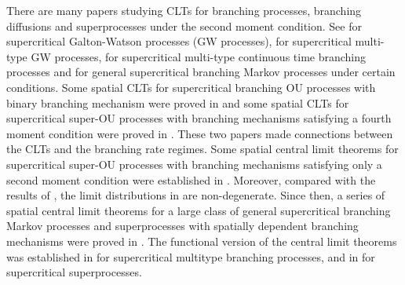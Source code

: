 \documentclass[12pt,a4paper]{amsart}
\theoremstyle{plain}
\theoremstyle{definition}
\numberwithin{equation}{section}
\begin{document}
There are many papers studying CLTs for branching processes, branching diffusions and superprocesses under the second moment condition.
See \cite{Heyde1970A-rate, HeydeBrown1871An-invariance, HeydeLeslie1971Improved} for supercritical Galton-Watson processes (GW processes), \cite{KestenStigum1966Additional,KestenStigum1966A-limit} for supercritical multi-type GW processes, \cite{Athreya1969Limit,Athreya1969LimitB,Athreya1971Some} for supercritical multi-type continuous time branching processes and \cite{AsmussenHering1983Branching} for general supercritical branching Markov processes under certain conditions.
Some spatial CLTs for   supercritical branching OU processes with binary branching mechanism were proved in \cite{AdamczakMilos2015CLT} and some spatial CLTs for supercritical super-OU processes with branching mechanisms satisfying a fourth moment condition were proved in \cite{Milos2012Spatial}.
These two papers made connections between the CLTs and  the branching rate regimes.
Some spatial central limit theorems for supercritical super-OU  processes with branching mechanisms satisfying only a second moment condition were established in \cite{RenSongZhang2014Central}.
Moreover, compared with the results of \cite{AdamczakMilos2015CLT,Milos2012Spatial}, the limit distributions in \cite{RenSongZhang2014Central} are non-degenerate.
Since then, a series of spatial central limit theorems for a large class of general supercritical branching Markov processes and superprocesses with spatially dependent branching mechanisms were proved in \cite{RenSongZhang2014CentralB,RenSongZhang2015Central,RenSongZhang2017Central}.
The functional version of the central limit theorems was established in \cite{Janson2004Functional} for supercritical multitype branching processes, and  in \cite{RenSongZhang2017Functional} for supercritical superprocesses.
\end{document}
